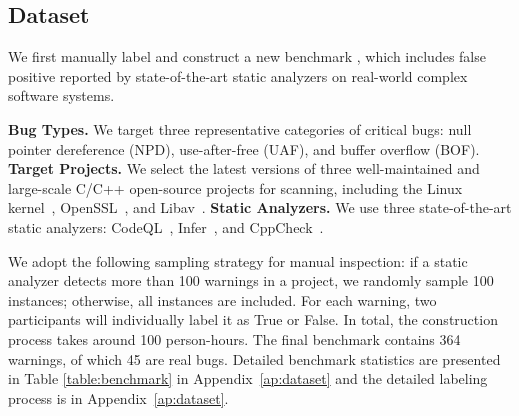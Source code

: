 \subsection{Dataset}

We first manually label and construct a new benchmark \ourbench{}, which includes false positive reported by state-of-the-art static analyzers on real-world complex software systems.  



\textbf{Bug Types.} We target three representative categories of critical bugs: null pointer dereference (NPD), use-after-free (UAF), and buffer overflow (BOF). 
\textbf{Target Projects.} We select the latest versions of three well-maintained and large-scale C/C++ open-source projects for scanning, including the Linux kernel~\cite{kernel}, OpenSSL~\cite{openssl}, and Libav~\cite{libav}.
\textbf{Static Analyzers.} We use three state-of-the-art static analyzers: CodeQL~\cite{codeql}, Infer~\cite{infer}, and CppCheck~\cite{cppcheck}. 


We adopt the following sampling strategy for manual inspection: if a static analyzer detects more than 100 warnings in a project, we randomly sample 100 instances; otherwise, all instances are included. For each warning, two participants will individually label it as True or False. In total, the construction process takes around 100 person-hours. The final benchmark \ourbench{} contains 364 warnings, of which 45 are real bugs. Detailed benchmark statistics are presented in Table \ref{table:benchmark} in Appendix~\ref{ap:dataset} and the detailed labeling process is in Appendix~\ref{ap:dataset}. 